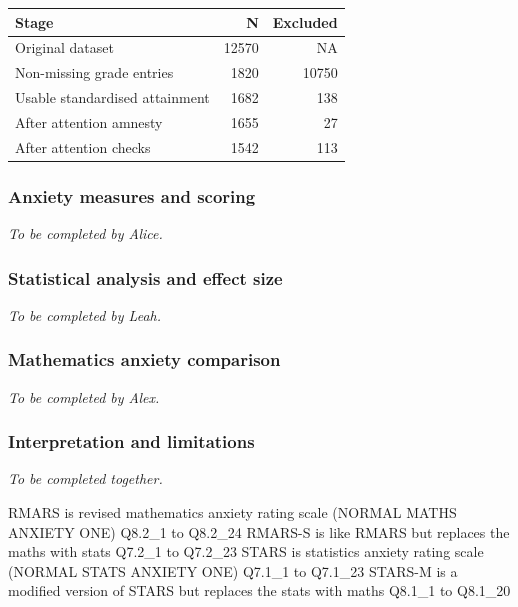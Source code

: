 \documentclass[
]{article}
\newcounter{none} %
\begin{document}
{\def\LTcaptype{none} %
\begin{longtable}[]{@{}lrr@{}}
\toprule\noalign{}
Stage & N & Excluded \\
\midrule\noalign{}
\endhead
\bottomrule\noalign{}
\endlastfoot
Original dataset & 12570 & NA \\
Non-missing grade entries & 1820 & 10750 \\
Usable standardised attainment & 1682 & 138 \\
After attention amnesty & 1655 & 27 \\
After attention checks & 1542 & 113 \\
\end{longtable}
}

\subsubsection{Anxiety measures and
scoring}\label{anxiety-measures-and-scoring}

\emph{To be completed by Alice.}

\subsubsection{Statistical analysis and effect
size}\label{statistical-analysis-and-effect-size}

\emph{To be completed by Leah.}

\subsubsection{Mathematics anxiety
comparison}\label{mathematics-anxiety-comparison}

\emph{To be completed by Alex.}

\subsubsection{Interpretation and
limitations}\label{interpretation-and-limitations}

\emph{To be completed together.}

RMARS is revised mathematics anxiety rating scale (NORMAL MATHS ANXIETY
ONE) Q8.2\_1 to Q8.2\_24 RMARS-S is like RMARS but replaces the maths
with stats Q7.2\_1 to Q7.2\_23 STARS is statistics anxiety rating scale
(NORMAL STATS ANXIETY ONE) Q7.1\_1 to Q7.1\_23 STARS-M is a modified
version of STARS but replaces the stats with maths Q8.1\_1 to Q8.1\_20
\end{document}
